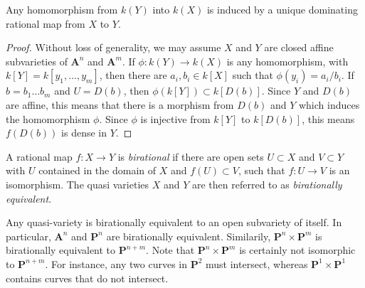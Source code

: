 \begin{theorem}
    Any homomorphism from $k(Y)$ into $k(X)$ is induced by a unique dominating rational map from $X$ to $Y$.
\end{theorem}
\begin{proof}
    Without loss of generality, we may assume $X$ and $Y$ are closed affine subvarieties of $\mathbf{A}^n$ and $\mathbf{A}^m$. If $\phi: k(Y) \to k(X)$ is any homomorphism, with $k[Y] = k[y_1,\dots,y_m]$, then there are $a_i,b_i \in k[X]$ such that $\phi(y_i) = a_i/b_i$. If $b = b_1 \dots b_m$ and $U = D(b)$, then $\phi(k[Y]) \subset k[D(b)]$. Since $Y$ and $D(b)$ are affine, this means that there is a morphism from $D(b)$ and $Y$ which induces the homomorphism $\phi$. Since $\phi$ is injective from $k[Y]$ to $k[D(b)]$, this means $f(D(b))$ is dense in $Y$.
\end{proof}

A rational map $f: X \to Y$ is \emph{birational} if there are open sets $U \subset X$ and $V \subset Y$ with $U$ contained in the domain of $X$ and $f(U) \subset V$, such that $f: U \to V$ is an isomorphism. The quasi varieties $X$ and $Y$ are then referred to as \emph{birationally equivalent}.

\begin{example}
    Any quasi-variety is birationally equivalent to an open subvariety of itself. In particular, $\mathbf{A}^n$ and $\mathbf{P}^n$ are birationally equivalent. Similarily, $\mathbf{P}^n \times \mathbf{P}^m$ is birationally equivalent to $\mathbf{P}^{n+m}$. Note that $\mathbf{P}^n \times \mathbf{P}^m$ is certainly not isomorphic to $\mathbf{P}^{n+m}$. For instance, any two curves in $\mathbf{P}^2$ must intersect, whereas $\mathbf{P}^1 \times \mathbf{P}^1$ contains curves that do not intersect.
\end{example}

